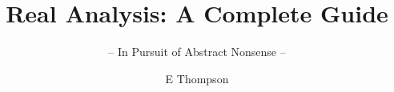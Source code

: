 \documentclass[graybox,envcountchap,sectrefs]{style/svmono}
\begin{document}
\author{E Thompson}
\title{Real Analysis: A Complete Guide}
\subtitle{-- In Pursuit of Abstract Nonsense --}
\maketitle

\frontmatter%

%
%

%

\tableofcontents

%


\mainmatter%




































%

\backmatter%
%
%
\printindex

\end{document}
